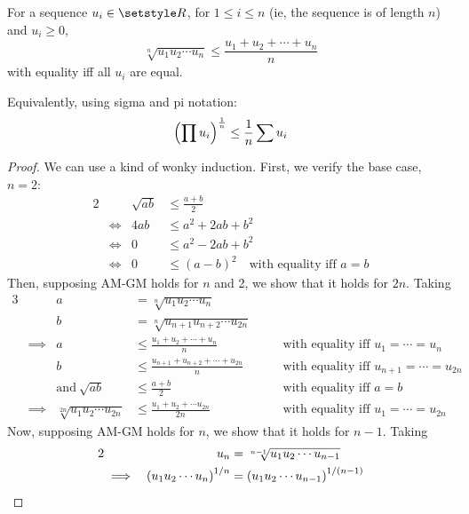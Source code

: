 \begin{theorem}[AM-GM inequality]
For a sequence \(u_i \in \Reals\), for \(1 \le i \le n\) (ie, the
sequence is of length \(n\)) and \(u_i \ge 0\),
\begin{equation*}
\sqrt[n]{u_1 u_2 \dotsm u_n} \le \frac{u_1 + u_2 + \dotsb + u_n}n
\end{equation*}
with equality iff all \(u_i\) are equal.

Equivalently, using sigma and pi notation:
\begin{equation*}
\pqty{\prod u_i}^\frac 1n \le \frac 1n\sum u_i
\end{equation*}
\end{theorem}
\begin{proof}
We can use a kind of wonky induction. First, we verify the base
case, \(n = 2\):
\begin{alignat*}2
&&\sqrt{ab} &\le \frac{a + b}2 \\
&\iff& 4ab &\le a^2 + 2ab + b^2 \\
&\iff& 0 &\le a^2 - 2ab + b^2 \\
&\iff& 0 &\le (a - b)^2\quad \text{with equality iff \(a = b\)}
\end{alignat*}
Then, supposing AM-GM holds for \(n\) and 2, we show that it holds for
\(2n\).  Taking
\begin{alignat*}3
&&a &= \sqrt[n]{u_1 u_2 \dotsm u_n} \\
&&b &= \sqrt[n]{u_{n+1} u_{n+2} \dotsm u_{2n}} \\
&\implies& a &\le \frac{u_1 + u_2 + \dotsb + u_n}n
        &&\quad \text{with equality iff \(u_1 = \dotsb = u_n\)}\\
&&b &\le \frac{u_{n + 1} + u_{n + 2} + \dotsb + u_{2n}}n
        &&\quad \text{with equality iff \(u_{n+1} = \dotsb = u_{2n}\)}\\
&&\text{and}\ \sqrt{ab} &\le \frac{a + b}2
    &&\quad \text{with equality iff \(a = b\)}\\
&\implies& \sqrt[2n]{u_1 u_2 \dotsm u_{2n}} &\le
         \frac{u_1 + u_2 + \dotsb u_{2n}}{2n}
        &&\quad \text{with equality iff \(u_1 = \dotsb = u_{2n}\)}
\end{alignat*}
Now, supposing AM-GM holds for \(n\), we show that it holds for \(n - 1\).
Taking
\begin{alignat*}2
&&u_n &= \sqrt[n - 1]{u_1 u_2 \dotsm u_{n - 1}} \\
&\implies& \pqty{u_1 u_2 \dotsm u_n}^{1 / n}
           &= \pqty{u_1 u_2 \dotsm u_{n - 1}}^{1 / (n - 1)} \\

\end{alignat*}
\end{proof}
